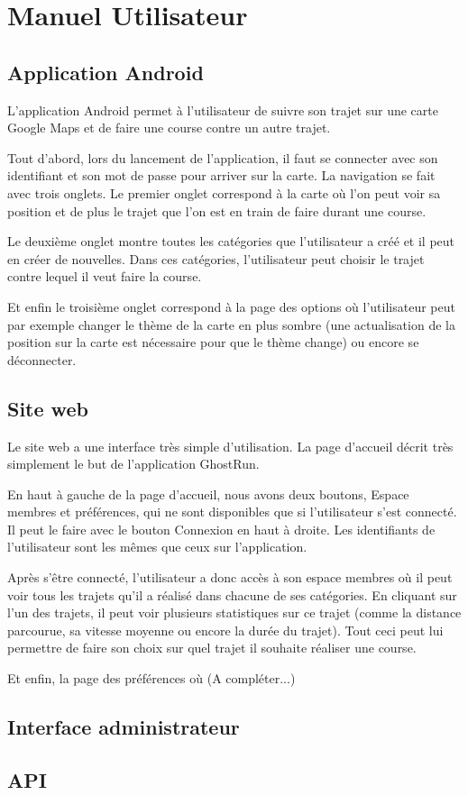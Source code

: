 \chapter{Manuel Utilisateur}

\section{Application Android}

L'application Android permet à l'utilisateur de suivre son trajet sur une carte Google Maps et de faire une course contre un autre trajet.

Tout d'abord, lors du lancement de l'application, il faut se connecter avec son identifiant et son mot de passe pour arriver sur la carte. La navigation se fait avec trois onglets. Le premier onglet correspond à la carte où l'on peut voir sa position et de plus le trajet que l'on est en train de faire durant une course.

Le deuxième onglet montre toutes les catégories que l'utilisateur a créé et il peut en créer de nouvelles. Dans ces catégories, l'utilisateur peut choisir le trajet contre lequel il veut faire la course.

Et enfin le troisième onglet correspond à la page des options où l'utilisateur peut par exemple changer le thème de la carte en plus sombre (une actualisation de la position sur la carte est nécessaire pour que le thème change) ou encore se déconnecter.

\section{Site web}

Le site web a une interface très simple d'utilisation. La page d'accueil décrit très simplement le but de l'application GhostRun.

En haut à gauche de la page d'accueil, nous avons deux boutons, Espace membres et préférences, qui ne sont disponibles que si l'utilisateur s'est connecté. Il peut le faire avec le bouton Connexion en haut à droite. Les identifiants de l'utilisateur sont les mêmes que ceux sur l'application.

Après s'être connecté, l'utilisateur a donc accès à son espace membres où il peut voir tous les trajets qu'il a réalisé dans chacune de ses catégories. En cliquant sur l'un des trajets, il peut voir plusieurs statistiques sur ce trajet (comme la distance parcourue, sa vitesse moyenne ou encore la durée du trajet). Tout ceci peut lui permettre de faire son choix sur quel trajet il souhaite réaliser une course.

Et enfin, la page des préférences où (A compléter...)

\section{Interface administrateur}


\section{API}